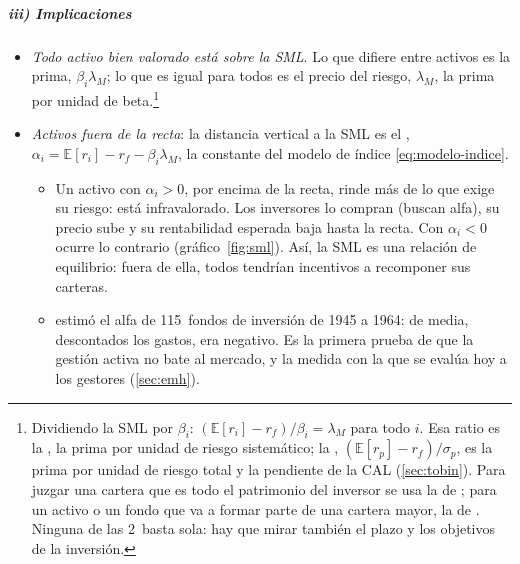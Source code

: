 \documentclass[11pt]{article}
\begin{document}
\begin{anotaciones}
\begin{tablacaja}
\begin{tabular}{>{\centering\arraybackslash}m{2.2cm}>{\centering\arraybackslash}m{2.4cm}>{\centering\arraybackslash}m{9.0cm}}
\bottomrule
\end{tabular}
\end{tablacaja}
\begin{infografiacaja}
\centering
\caption{Riesgo total, sistemático y específico de un activo}\label{figu:triangulo-riesgo}
\end{infografiacaja}
\end{anotaciones}

\subparagraph{iii) Implicaciones}

\begin{itemize}
\item \emph{Todo activo bien valorado está sobre la SML}. Lo que difiere entre activos es la prima, $\beta_i\lambda_M$; lo que es igual para todos es el precio del riesgo, $\lambda_M$, la prima por unidad de beta.\footnote{Dividiendo la SML por $\beta_i$: $(\mathbb{E}[r_i]-r_f)/\beta_i=\lambda_M$ para todo $i$. Esa ratio es la , la prima por unidad de riesgo sistemático; la , $(\mathbb{E}[r_p]-r_f)/\sigma_p$, es la prima por unidad de riesgo total y la pendiente de la CAL (\ref{sec:tobin}). Para juzgar una cartera que es todo el patrimonio del inversor se usa la de ; para un activo o un fondo que va a formar parte de una cartera mayor, la de . Ninguna de las 2~basta sola: hay que mirar también el plazo y los objetivos de la inversión.}
\item \emph{Activos fuera de la recta}: la distancia vertical a la SML es el \nocite{Jensen1968Performance}, $\alpha_i=\mathbb{E}[r_i]-r_f-\beta_i\lambda_M$, la constante del modelo de índice \eqref{eq:modelo-indice}.
  \begin{itemize}
  \item Un activo con $\alpha_i>0$, por encima de la recta, rinde más de lo que exige su riesgo: está infravalorado. Los inversores lo compran (buscan alfa), su precio sube y su rentabilidad esperada baja hasta la recta. Con $\alpha_i<0$ ocurre lo contrario (gráfico~\ref{fig:sml}). Así, la SML es una relación de equilibrio: fuera de ella, todos tendrían incentivos a recomponer sus carteras.
  \item \textcite{Jensen1968Performance} estimó el alfa de 115~fondos de inversión de 1945 a 1964: de media, descontados los gastos, era negativo. Es la primera prueba de que la gestión activa no bate al mercado, y la medida con la que se evalúa hoy a los gestores (\ref{sec:emh}).

\end{itemize}
\end{itemize}
\end{document}
